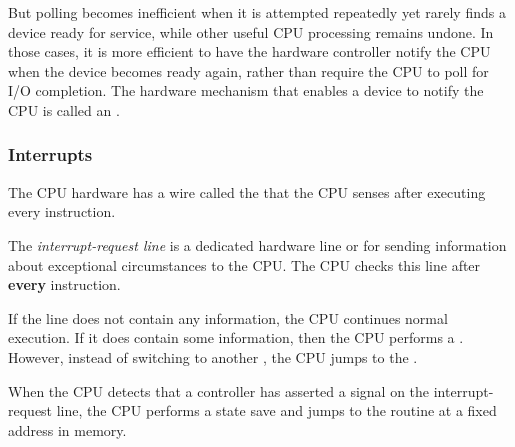 But polling becomes inefficient when it is attempted repeatedly yet rarely finds a device ready for service, while other useful CPU processing remains undone.
In those cases, it is more efficient to have the hardware controller notify the CPU when the device becomes ready again, rather than require the CPU to poll for I/O completion.
The hardware mechanism that enables a device to notify the CPU is called an .

\subsubsection{Interrupts}\label{subsubsec:Interrupts}
The CPU hardware has a wire called the  that the CPU senses after executing every instruction.

\begin{definition}\label{def:Interrupt_Request_Line}
  The \emph{interrupt-request line} is a dedicated hardware line or  for sending information about exceptional circumstances to the CPU.\@
  The CPU checks this line after \textbf{every} instruction.

  If the line does not contain any information, the CPU continues normal execution.
  If it does contain some information, then the CPU performs a .
  However, instead of switching to another , the CPU jumps to the .
\end{definition}

When the CPU detects that a controller has asserted a signal on the interrupt-request line, the CPU performs a state save and jumps to the  routine at a fixed address in memory.


